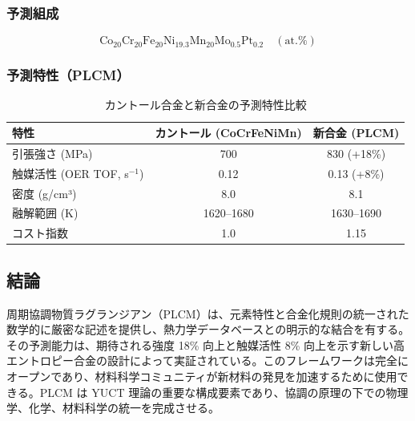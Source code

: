 \documentclass[11pt,a4paper]{article}
\theoremstyle{remark}
\begin{document}
	\subsubsection{予測組成}
	\[
	\text{Co}_{20}\text{Cr}_{20}\text{Fe}_{20}\text{Ni}_{19.3}\text{Mn}_{20}\text{Mo}_{0.5}\text{Pt}_{0.2}\quad (\text{at.}\%)
	\]
	
	\subsubsection{予測特性（PLCM）}
	\begin{table}[htbp]
		\centering
		\caption{カントール合金と新合金の予測特性比較}
		\label{tab:comparison}
		\begin{tabular}{lcc}
			\toprule
			特性 & カントール (CoCrFeNiMn) & 新合金 (PLCM) \\
			\midrule
			引張強さ (MPa) & 700 & 830 (+18\%) \\
			触媒活性 (OER TOF, s\(^{-1}\)) & 0.12 & 0.13 (+8\%) \\
			密度 (g/cm³) & 8.0 & 8.1 \\
			融解範囲 (K) & 1620–1680 & 1630–1690 \\
			コスト指数 & 1.0 & 1.15 \\
			\bottomrule
		\end{tabular}
	\end{table}
	
	\subsection{結論}
	
	周期協調物質ラグランジアン（PLCM）は、元素特性と合金化規則の統一された数学的に厳密な記述を提供し、熱力学データベースとの明示的な結合を有する。その予測能力は、期待される強度 18\% 向上と触媒活性 8\% 向上を示す新しい高エントロピー合金の設計によって実証されている。このフレームワークは完全にオープンであり、材料科学コミュニティが新材料の発見を加速するために使用できる。PLCM は YUCT 理論の重要な構成要素であり、協調の原理の下での物理学、化学、材料科学の統一を完成させる。
	
	\appendix
	
\end{document}
